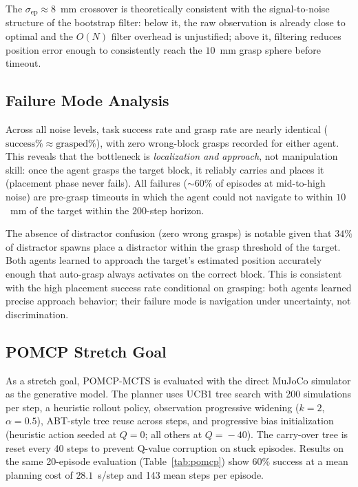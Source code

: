 \documentclass[conference]{IEEEtran}
\newcommand{\sigmaep}{\sigma_{\text{ep}}}
\begin{document}
The $\sigmaep \approx 8$~mm crossover is theoretically consistent with the
signal-to-noise structure of the bootstrap filter: below it, the raw
observation is already close to optimal and the $O(N)$ filter overhead
is unjustified; above it, filtering reduces position error enough to
consistently reach the $10$~mm grasp sphere before timeout.

\subsection{Failure Mode Analysis}

Across all noise levels, task success rate and grasp rate are nearly
identical ($\text{success}\% \approx \text{grasped}\%$), with zero
wrong-block grasps recorded for either agent.
This reveals that the bottleneck is \emph{localization and approach},
not manipulation skill: once the agent grasps the target block, it
reliably carries and places it (placement phase never fails).
All failures ($\sim\!60\%$ of episodes at mid-to-high noise) are
pre-grasp timeouts in which the agent could not navigate to within $10$~mm
of the target within the $200$-step horizon.

The absence of distractor confusion (zero wrong grasps) is notable given
that $34\%$ of distractor spawns place a distractor within the grasp
threshold of the target.
Both agents learned to approach the target's estimated position accurately
enough that auto-grasp always activates on the correct block.
This is consistent with the high placement success rate conditional on
grasping: both agents learned precise approach behavior; their failure
mode is navigation under uncertainty, not discrimination.

\subsection{POMCP Stretch Goal}

As a stretch goal, POMCP-MCTS is evaluated with the direct MuJoCo simulator
as the generative model.
The planner uses UCB1 tree search with 200 simulations per step, a heuristic
rollout policy, observation progressive widening ($k\!=\!2$, $\alpha\!=\!0.5$),
ABT-style tree reuse across steps, and progressive bias initialization
(heuristic action seeded at $Q\!=\!0$; all others at $Q\!=\!-40$).
The carry-over tree is reset every 40 steps to prevent Q-value corruption
on stuck episodes.
Results on the same 20-episode evaluation (Table~\ref{tab:pomcp}) show
$60\%$ success at a mean planning cost of $28.1$~s/step and 143 mean steps
per episode.
\end{document}
